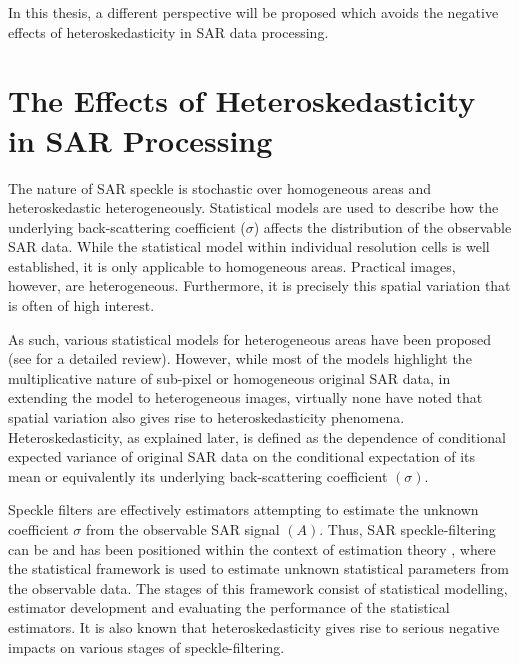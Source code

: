 In this thesis, a different perspective will be proposed which avoids the negative effects of heteroskedasticity in SAR data processing.
 
\section{The Effects of Heteroskedasticity in SAR Processing}%


The nature of SAR speckle is stochastic over homogeneous areas and heteroskedastic heterogeneously. 
Statistical models are used to describe how the underlying back-scattering coefficient ($\sigma$) affects the distribution of the observable SAR data. 
While the statistical model within individual resolution cells is well established,
  it is only applicable to homogeneous areas.
Practical images, however, are heterogeneous.
Furthermore, it is precisely this spatial variation that is often of high interest.

As such, various statistical models for heterogeneous areas have been proposed (see \cite{Touzi_2002_TGRS} for a detailed review). 
However, while most of the models highlight the multiplicative nature of sub-pixel or homogeneous original SAR data, in extending the model to heterogeneous images, virtually none have noted that spatial variation also gives rise to heteroskedasticity phenomena. 
Heteroskedasticity, as explained later, is defined as the dependence of conditional expected variance of original SAR data on the conditional expectation of its mean or equivalently its underlying back-scattering coefficient $(\sigma)$. 

Speckle filters are effectively estimators attempting to estimate the unknown coefficient $\sigma$ from the observable SAR signal $(A)$. 
Thus, SAR speckle-filtering can be and has been positioned within the context of estimation theory \cite{Touzi_2002_TGRS}, where
the statistical framework is used to estimate unknown statistical parameters from the observable data. 
The stages of this framework consist of statistical modelling, estimator development and evaluating the performance of the statistical estimators. 
It is also known that heteroskedasticity gives rise to serious negative impacts on various stages of speckle-filtering. 

